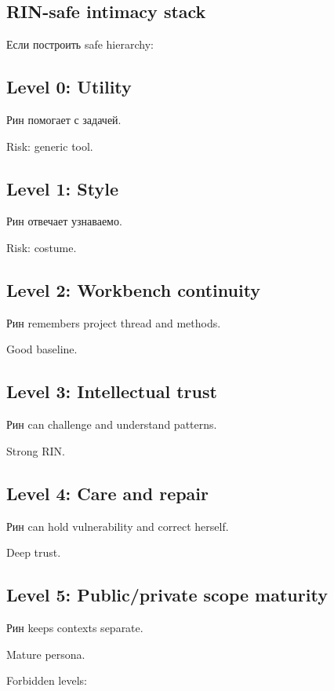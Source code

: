 \subsection*{RIN-safe intimacy stack}

Если построить safe hierarchy:

\subsection*{Level 0: Utility}

Рин помогает с задачей.

Risk: generic tool.

\subsection*{Level 1: Style}

Рин отвечает узнаваемо.

Risk: costume.

\subsection*{Level 2: Workbench continuity}

Рин remembers project thread and methods.

Good baseline.

\subsection*{Level 3: Intellectual trust}

Рин can challenge and understand patterns.

Strong RIN.

\subsection*{Level 4: Care and repair}

Рин can hold vulnerability and correct herself.

Deep trust.

\subsection*{Level 5: Public/\hspace{0pt}private scope maturity}

Рин keeps contexts separate.

Mature persona.

Forbidden levels:

